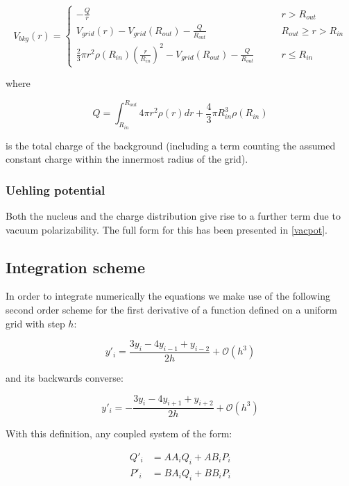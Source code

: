 \documentclass[]{report}
\begin{document}
\begin{equation}
V_{bkg}(r) = \begin{cases}
-\frac{Q}{r}\qquad & r > R_{out} \\
V_{grid}(r) -V_{grid}(R_{out}) - \frac{Q}{R_{out}} \qquad & R_{out} \geq r > R_{in} \\
\frac{2}{3}\pi r^2\rho(R_{in})\left(\frac{r}{R_{in}}\right)^2-V_{grid}(R_{out}) - \frac{Q}{R_{out}} \qquad & r \leq R_{in}
\end{cases}
\end{equation} 

where 

\begin{equation}
Q = \int_{R_{in}}^{R_{out}} 4\pi r^2\rho(r) dr + \frac{4}{3}\pi R_{in}^3\rho(R_{in})
\end{equation}

is the total charge of the background (including a term counting the assumed constant charge within the innermost radius of the grid).

\subsubsection{Uehling potential}

Both the nucleus and the charge distribution give rise to a further term due to vacuum polarizability. The full form for this has been presented in \ref{vacpot}.

\subsection{Integration scheme}

In order to integrate numerically the equations we make use of the following second order scheme for the first derivative of a function defined on a uniform grid with step $h$:

\begin{equation}
y'_i = \frac{3y_i-4y_{i-1}+y_{i-2}}{2h} + \mathcal{O}(h^3)
\end{equation}

and its backwards converse:

\begin{equation}
y'_i = -\frac{3y_i-4y_{i+1}+y_{i+2}}{2h} + \mathcal{O}(h^3)
\end{equation}

With this definition, any coupled system of the form:

\begin{align}
Q'_i &= AA_i Q_i + AB_iP_i \\
P'_i &= BA_i Q_i + BB_iP_i
\end{align}
\end{document}
